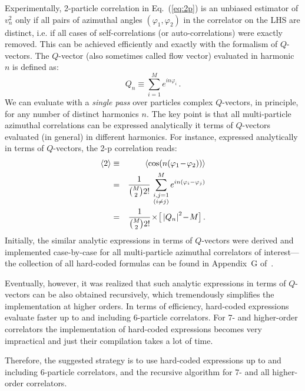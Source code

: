 \documentclass[12pt]{article}
\begin{document}
Experimentally, 2-particle correlation in Eq.~(\ref{eq:2p}) is an unbiased estimator of $v_n^2$ only if all pairs of azimuthal angles $(\varphi_1,\varphi_2)$ in the correlator on the LHS are distinct, i.e. if all cases of self-correlations (or auto-correlations) were exactly removed. This can be achieved efficiently and exactly with the formalism of $Q$-vectors. The $Q$-vector (also sometimes called flow vector) evaluated in harmonic $n$ is defined as:
%
\begin{equation}
Q_{n}\equiv\sum_{i=1}^{M}e^{in\varphi_i}\,.
\label{a:q-vector}
\end{equation}
% 
We can evaluate with a {\it single pass} over particles complex $Q$-vectors, in principle, for any number of distinct harmonics $n$. The key point is that all multi-particle azimuthal correlations can be expressed analytically it terms of $Q$-vectors evaluated (in general) in different harmonics. For instance, expressed analytically in terms of $Q$-vectors, the 2-p correlation reads:
%
\begin{eqnarray}
\left<2\right> &\equiv& \left<\cos(n(\varphi_1\!-\!\varphi_2))\right>\nonumber\\ 
&=&\frac{1}{\binom{M}{2}2!}\,\sum_{\begin{subarray}{c}i,j=1\\ (i\neq j)\end{subarray}}^{M} e^{in(\varphi_i-\varphi_j)}\nonumber\\
&=&\frac{1}{\binom{M}{2}2!}\!\times\!
\big[\left|Q_{n}\right|^2\!-\!M\big]\,.
\label{eq:two1n1n}
\end{eqnarray}
%
Initially, the similar analytic expressions in terms of $Q$-vectors were derived and implemented case-by-case for all multi-particle azimuthal correlators of interest---the collection of all hard-coded formulas can be found in Appendix~G of~\cite{Bilandzic:2012wva}.

Eventually, however, it was realized that such analytic expressions in terms of $Q$-vectors can be also obtained recursively, which tremendously simplifies the implementation at higher orders. In terms of efficiency, hard-coded expressions evaluate faster up to and including 6-particle correlators. For 7- and higher-order correlators the implementation of hard-coded expressions becomes very impractical and just their compilation takes a lot of time.

Therefore, the suggested strategy is to use hard-coded expressions up to and including 6-particle correlators, and the recursive algorithm for 7- and all higher-order correlators.  
\end{document}

